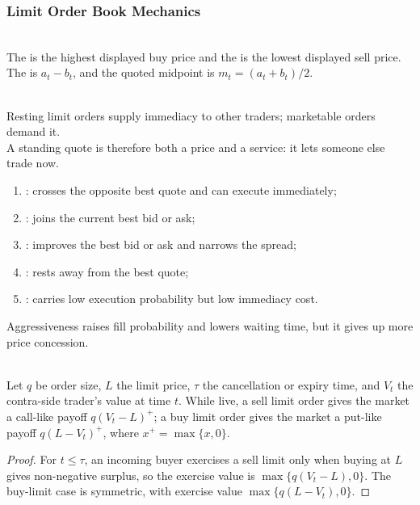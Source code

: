 \subsubsection{Limit Order Book Mechanics}

\begin{definition} \\
The  is the highest displayed buy price and the  is the lowest displayed sell price. The  is $a_t-b_t$, and the quoted midpoint is $m_t=(a_t+b_t)/2$.
\end{definition}

\begin{principle} \\
Resting limit orders supply immediacy to other traders; marketable orders demand it.\\
A standing quote is therefore both a price and a service: it lets someone else trade now.
\end{principle}

\begin{taxonomy} 
\begin{enumerate}[label=\roman*.]
\setlength{\itemsep}{0pt}
\item {}: crosses the opposite best quote and can execute immediately;
\item {}: joins the current best bid or ask;
\item {}: improves the best bid or ask and narrows the spread;
\item {}: rests away from the best quote;
\item {}: carries low execution probability but low immediacy cost.
\end{enumerate}
Aggressiveness raises fill probability and lowers waiting time, but it gives up more price concession.
\end{taxonomy}

\begin{proposition} \\
Let $q$ be order size, $L$ the limit price, $\tau$ the cancellation or expiry time, and $V_t$ the contra-side trader's value at time $t$. While live, a sell limit order gives the market a call-like payoff $q(V_t-L)^+$; a buy limit order gives the market a put-like payoff $q(L-V_t)^+$, where $x^+=\max\{x,0\}$.
\begin{proof}
For $t\leq\tau$, an incoming buyer exercises a sell limit only when buying at $L$ gives non-negative surplus, so the exercise value is $\max\{q(V_t-L),0\}$. The buy-limit case is symmetric, with exercise value $\max\{q(L-V_t),0\}$.
\end{proof}
\end{proposition}

